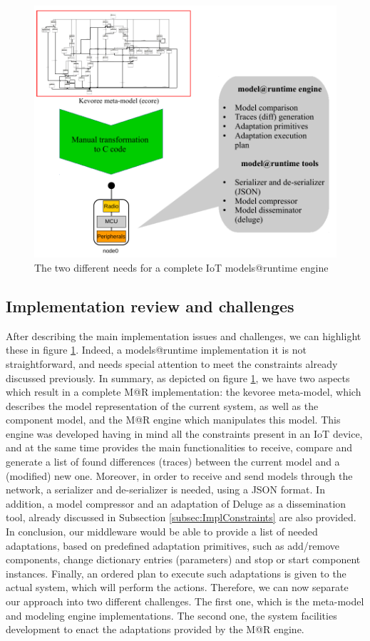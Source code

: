 \begin{figure}[]
	\centering
	\includegraphics[width=0.85\columnwidth]{chapters/modelsAtRuntimeContiki.images/Challenges.pdf}
	\caption{The two different needs for a complete IoT models@runtime engine}
	\label{fig:MAR_Challenges}
\end{figure}

\subsection{Implementation review and challenges}
\label{subsec:implReview}
After describing the main implementation issues and challenges, we can highlight these in figure \ref{fig:MAR_Challenges}.
Indeed, a models@runtime implementation it is not straightforward, and needs special attention to meet the constraints already discussed previously.
In summary, as depicted on figure \ref{fig:MAR_Challenges}, we have two aspects which result in a complete M@R implementation: the kevoree meta-model, which describes the model representation of the current system, as well as the component model, and the M@R engine which manipulates this model.
This engine was developed having in mind all the constraints present in an IoT device, and at the same time provides the main functionalities to receive, compare and generate a list of found differences (traces) between the current model and a (modified) new one.
Moreover, in order to receive and send models through the network, a serializer and de-serializer is needed, using a JSON format.
In addition, a model compressor and an adaptation of Deluge as a dissemination tool, already discussed in Subsection \ref{subsec:ImplConstraints} are also provided.
In conclusion, our middleware would be able to provide a list of needed adaptations, based on predefined adaptation primitives, such as add/remove components, change dictionary entries (parameters) and stop or start component instances.
Finally, an ordered plan to execute such adaptations is given to the actual system, which will perform the actions.
Therefore, we can now separate our approach into two different challenges.
The first one, which is the meta-model and modeling engine implementations.
The second one, the system facilities development to enact the adaptations provided by the M@R engine.

